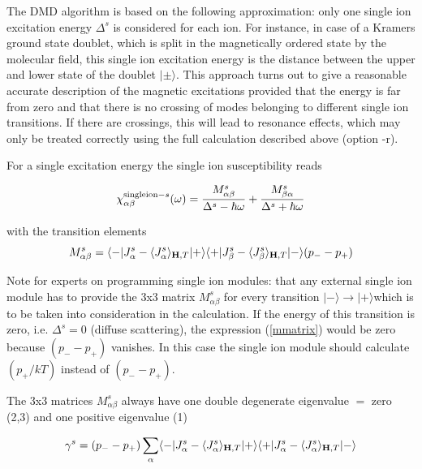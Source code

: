  The DMD algorithm is
  based on the following approximation:
  only one single ion excitation energy
$\Delta^s$ is considered for each ion. For instance, in case of a Kramers ground state
doublet, which is split in the magnetically ordered state by the molecular
field, this single ion excitation energy is the distance between the upper
and lower state of the doublet $|\pm\rangle$.
 This approach turns out to 
give a reasonable accurate description of the magnetic excitations provided
that the energy is far from zero and that there is no crossing of modes
belonging to different single ion transitions. If there are crossings, this will lead to
resonance effects, which may only be treated correctly using the full calculation
described above (option {\prg -r}).

For a single excitation energy the single ion susceptibility
reads

\begin{equation}
\chi^{{\rm single ion-} s}_{\alpha\beta}(\omega)=
\frac{M^s_{\alpha\beta}}{\Delta^s-\hbar \omega}+
\frac{M^s_{\beta\alpha}}{\Delta^s+\hbar \omega}
\end{equation}

with the transition elements
\begin{equation}\label{mmatrix}
M^s_{\alpha\beta}=\langle -|J^s_{\alpha}-\langle J^s_{\alpha}\rangle_{\mathbf H,T}|+\rangle\langle +|J^s_{\beta}-\langle J^s_{\beta}\rangle_{\mathbf H,T}|-\rangle
(p_--p_+)
\end{equation}

{\tiny Note for experts on programming single ion modules: that any external single ion module has to provide the 3x3 %
matrix $M^s_{\alpha\beta}$ for every transition
$|-\rangle \rightarrow |+\rangle$which is to be taken into consideration in the calculation. If the energy of this transition
is zero, i.e. $\Delta^s=0$ (diffuse scattering), the expression (\ref{mmatrix}) would be zero because $(p_--p_+)$ %
vanishes.
In this case the single ion module should calculate $(p_+/kT)$ instead of $(p_--p_+)$.
}
   
 The 3x3 matrices $M^s_{\alpha\beta}$
always have one double degenerate eigenvalue $=$ zero (2,3) and one 
positive eigenvalue (1)

\begin{equation}
\gamma^s=(p_--p_+)\sum_{\alpha}\langle -|J^s_{\alpha}-\langle J^s_{\alpha}\rangle_{\mathbf H,T}|+\rangle\langle +|J^s_{\alpha}-\langle J^s_{\alpha}\rangle_{\mathbf H,T}|-\rangle
\end{equation}

